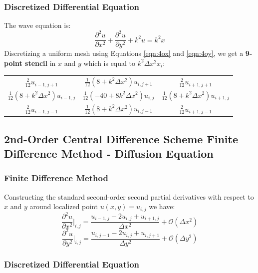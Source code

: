 \documentclass[10pt]{article}		%
\numberwithin{equation}{section}
\newcommand{\psder}[2]{\dfrac{\partial^2#1}{\partial#2^2}}		%
\begin{document}
\subsubsection{Discretized Differential Equation}

The wave equation is:
\begin{equation}
\psder{u}{x} + \psder{u}{y} +  k^2u = k^2x
\end{equation}
Discretizing a uniform mesh using Equations \ref{eqn:4ox} and \ref{eqn:4oy}, we get a \textbf{9-point stencil} in $x$ and $y$ which is equal to $k^2\Delta x^2 x_i$:

\begin{table}[H]
	\begin{tabular}{ccc}
		$\tfrac{2}{12}u_{i-1, j+1}$ & $\tfrac{1}{12}(8+k^2\Delta x^2)u_{i, j+1}$ & $\tfrac{2}{12}u_{i+1, j+1}$  \\
		$\tfrac{1}{12}(8+k^2\Delta x^2)u_{i-1, j}$ & $\tfrac{1}{12}(-40+8k^2\Delta x^2)u_{i, j}$ & $\tfrac{1}{12}(8+k^2\Delta x^2)u_{i+1, j}$ \\
		$\tfrac{2}{12}u_{i-1, j-1}$ & $\tfrac{1}{12}(8+k^2\Delta x^2)u_{i, j-1}$ & $\tfrac{2}{12}u_{i+1, j-1}$
	\end{tabular}
\end{table}

\subsection{2nd-Order Central Difference Scheme Finite Difference Method - Diffusion Equation}

\subsubsection{Finite Difference Method}

Constructing the standard second-order second partial derivatives with respect to $x$ and $y$ around localized point $u(x,y)=u_{i,j}$ we have:
\begin{equation}
\label{eqn:2oxd}
\psder{u}{x}\Big|_{i,j} = \frac{u_{i-1, j} - 2u_{i,j} + u_{i+1, j}}{\Delta x^2} + \mathcal{O}(\Delta x^2)
\end{equation}
\begin{equation}
\label{eqn:2oyd}
\psder{u}{y}\Big|_{i,j} = \frac{u_{i, j-1} - 2u_{i,j} + u_{i, j+1}}{\Delta y^2} + \mathcal{O}(\Delta y^2)
\end{equation}

\subsubsection{Discretized Differential Equation}
\end{document}
